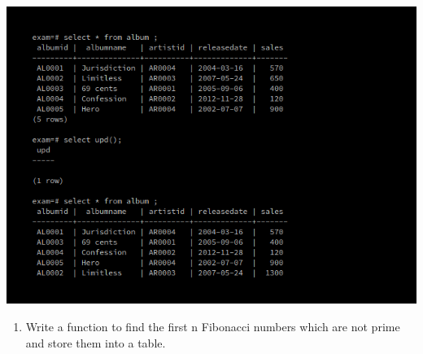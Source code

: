 \documentclass[
]{article}
\providecommand{\tightlist}{%
  \setlength{\itemsep}{0pt}\setlength{\parskip}{0pt}}
\begin{document}
\includegraphics{../Images/Exam_Report/10.png}

\begin{enumerate}
\def\labelenumi{\arabic{enumi}.}
\setcounter{enumi}{10}
\tightlist
\item
  Write a function to find the first n Fibonacci numbers which are not
  prime and store them into a table.
\end{enumerate}
\end{document}
